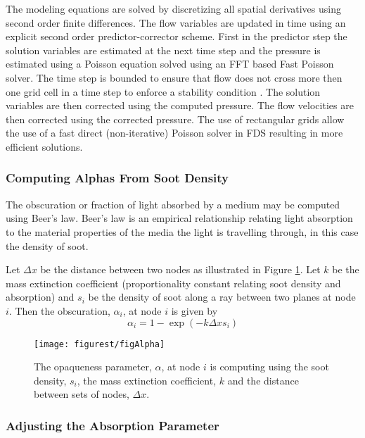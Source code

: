 The modeling equations are solved by discretizing all spatial
derivatives using second order finite differences. The flow
variables are updated in time using an explicit second order
predictor-corrector scheme.  First in the predictor step the
solution variables are estimated at the next time step and the
pressure is estimated using a Poisson equation solved using an FFT
based Fast Poisson solver\cite{Sweet:1}. The time step is bounded
to ensure that flow does not cross more then one grid cell in a
time step to enforce a stability condition . The solution
variables are then corrected using the computed pressure. The flow
velocities are then corrected using the corrected pressure.  The
use of rectangular grids allow the use of a fast direct
(non-iterative) Poisson solver in FDS resulting in more efficient
solutions.



\subsubsection{Computing Alphas From Soot Density} The obscuration
or fraction of light absorbed by a medium may be computed using
Beer's law\cite{Siegel:2001}. Beer's law is an empirical
relationship relating light absorption to the material properties
of the media the light is travelling through, in this case the
density of soot.

Let $\Delta x$ be the distance between two nodes as illustrated in
Figure \ref{figAlpha}.  Let $k$ be the mass extinction coefficient
(proportionality constant relating soot density and absorption)
and $s_i$ be the density of soot along a ray between two planes at
node $i$.  Then the obscuration, $\alpha_i$, at node $i$ is given
by
\begin{equation}
\alpha_i=1-\exp(-k\Delta xs_i) \label{eq:alpha}
\end{equation}

\begin{figure}[t]
\centerline{\texttt{[image: figurest/figAlpha]}}
\caption [Opaqueness is computed using the soot density, the mass
extinction coefficient and the distance to the next set of
nodes.]{ The opaqueness parameter, $\alpha$, at node $i$ is
computing using the soot density, $s_i$, the mass extinction
coefficient, $k$ and the distance between sets of nodes, $\Delta
x$. } \label{figAlpha}
\end{figure}

\subsubsection{Adjusting the Absorption Parameter}

